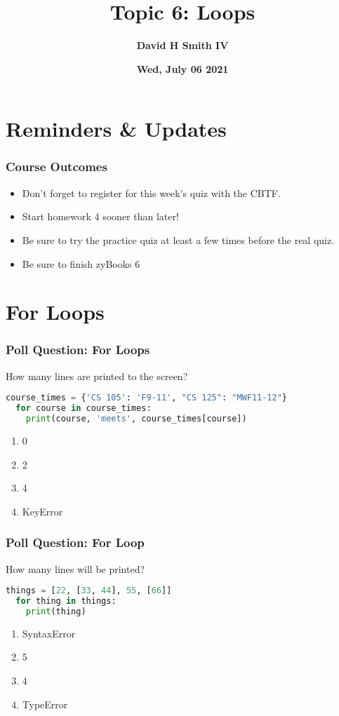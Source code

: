 \documentclass{beamer}
\title{\textbf{Topic 6: Loops}}
\author{\textbf{David H Smith IV}}
\institute[\textbf{UIUC}]{\textbf{University of Illinois Urbana-Champaign}}
\date{\textbf{Wed, July 06 2021}}
\begin{document}
\frame{\titlepage}

\section{Reminders \& Updates}

%
%
\begin{frame}
  \frametitle{Course Outcomes}
  \begin{itemize}
    \item Don't forget to register for this week's quiz with the CBTF.
    \item Start homework 4 sooner than later! 
    \item Be sure to try the practice quiz at least a few times before the real quiz.
    \item Be sure to finish zyBooks 6
  \end{itemize}
\end{frame}

\section{For Loops}

%
%
\begin{frame}[fragile]
  \frametitle{Poll Question: For Loops}
  How many lines are printed to the screen?
  \begin{lstlisting}[language=Python, autogobble]
  course_times = {'CS 105': 'F9-11', "CS 125": "MWF11-12"}
  for course in course_times:
    print(course, 'meets', course_times[course])
  \end{lstlisting}
  \vfill
  \begin{enumerate}[A]
    \item 0
    \item 2
    \item 4
    \item KeyError
  \end{enumerate}
\end{frame}

%
%
\begin{frame}[fragile]
  \frametitle{Poll Question: For Loop}
  How many lines will be printed?
  \begin{lstlisting}[language=Python, autogobble]
  things = [22, [33, 44], 55, [66]]
  for thing in things:
    print(thing)
  \end{lstlisting}
  \vfill
  \begin{enumerate}[A]
    \item SyntaxError
    \item 5
    \item 4
    \item TypeError
  \end{enumerate}
\end{frame}
\end{document}
